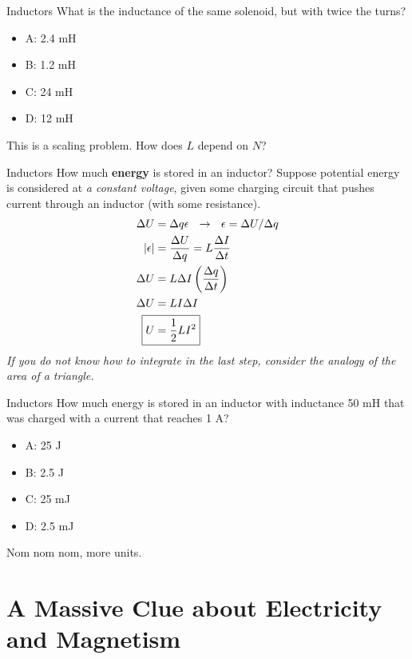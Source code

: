 \documentclass{beamer}
\begin{document}
\begin{frame}{Inductors}
What is the inductance of the same solenoid, but with twice the turns?
\begin{itemize}
\item A: 2.4 mH
\item B: 1.2 mH
\item C: 24 mH 
\item D: 12 mH
\end{itemize}
\footnotesize
This is a scaling problem.  How does $L$ depend on $N$?
\end{frame}

\begin{frame}{Inductors}
\small
How much \textbf{\alert{energy}} is stored in an inductor?  Suppose potential energy is considered at \textit{a constant voltage}, given some charging circuit that pushes current through an inductor (with some resistance).
\begin{align}
\Delta U &= \Delta q \epsilon ~~ \rightarrow ~~ \epsilon = \Delta U/\Delta q \\
|\epsilon| &= \frac{\Delta U}{\Delta q} = L \frac{\Delta I}{\Delta t} \\
\Delta U &= L \Delta I \left( \frac{\Delta q}{\Delta t} \right) \\
\Delta U &= L I \Delta I \\
\Aboxed{ U &= \frac{1}{2} L I^2}
\end{align}
\footnotesize
\textit{If you do not know how to integrate in the last step, consider the analogy of the area of a triangle.}
\end{frame}

\begin{frame}{Inductors}
How much energy is stored in an inductor with inductance 50 mH that was charged with a current that reaches 1 A?
\begin{itemize}
\item A: 25 J
\item B: 2.5 J
\item C: 25 mJ 
\item D: 2.5 mJ
\end{itemize}
\footnotesize
Nom nom nom, more units.
\end{frame}

\section{A Massive Clue about Electricity and Magnetism}
\end{document}
